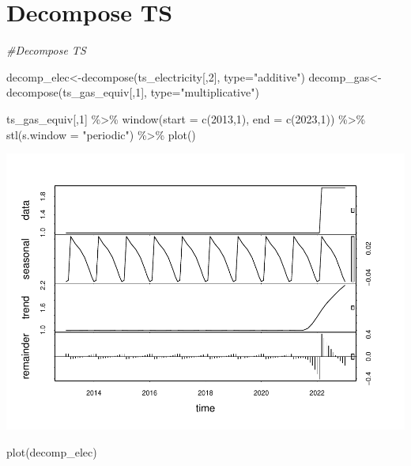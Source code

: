 \documentclass[
]{article}
\newenvironment{Shaded}{\begin{snugshade}}{\end{snugshade}}
\newcommand{\AttributeTok}[1]{\textcolor[rgb]{0.77,0.63,0.00}{#1}}
\newcommand{\CommentTok}[1]{\textcolor[rgb]{0.56,0.35,0.01}{\textit{#1}}}
\newcommand{\DecValTok}[1]{\textcolor[rgb]{0.00,0.00,0.81}{#1}}
\newcommand{\FunctionTok}[1]{\textcolor[rgb]{0.00,0.00,0.00}{#1}}
\newcommand{\NormalTok}[1]{#1}
\newcommand{\OtherTok}[1]{\textcolor[rgb]{0.56,0.35,0.01}{#1}}
\newcommand{\SpecialCharTok}[1]{\textcolor[rgb]{0.00,0.00,0.00}{#1}}
\newcommand{\StringTok}[1]{\textcolor[rgb]{0.31,0.60,0.02}{#1}}
\begin{document}
\hypertarget{decompose-ts}{%
\section{Decompose TS}\label{decompose-ts}}

\begin{Shaded}
\begin{Highlighting}[]
\CommentTok{\#Decompose TS}

\NormalTok{decomp\_elec}\OtherTok{\textless{}{-}}\FunctionTok{decompose}\NormalTok{(ts\_electricity[,}\DecValTok{2}\NormalTok{], }\AttributeTok{type=}\StringTok{"additive"}\NormalTok{)}
\NormalTok{decomp\_gas}\OtherTok{\textless{}{-}}\FunctionTok{decompose}\NormalTok{(ts\_gas\_equiv[,}\DecValTok{1}\NormalTok{], }\AttributeTok{type=}\StringTok{"multiplicative"}\NormalTok{)}

\NormalTok{ts\_gas\_equiv[,}\DecValTok{1}\NormalTok{] }\SpecialCharTok{\%\textgreater{}\%} 
  \FunctionTok{window}\NormalTok{(}\AttributeTok{start =} \FunctionTok{c}\NormalTok{(}\DecValTok{2013}\NormalTok{,}\DecValTok{1}\NormalTok{), }\AttributeTok{end =} \FunctionTok{c}\NormalTok{(}\DecValTok{2023}\NormalTok{,}\DecValTok{1}\NormalTok{)) }\SpecialCharTok{\%\textgreater{}\%}
  \FunctionTok{stl}\NormalTok{(}\AttributeTok{s.window =} \StringTok{"periodic"}\NormalTok{) }\SpecialCharTok{\%\textgreater{}\%} 
  \FunctionTok{plot}\NormalTok{()}
\end{Highlighting}
\end{Shaded}

\includegraphics{Final-Project_files/figure-latex/unnamed-chunk-5-1.pdf}

\begin{Shaded}
\begin{Highlighting}[]
\FunctionTok{plot}\NormalTok{(decomp\_elec)}
\end{Highlighting}
\end{Shaded}
\end{document}
